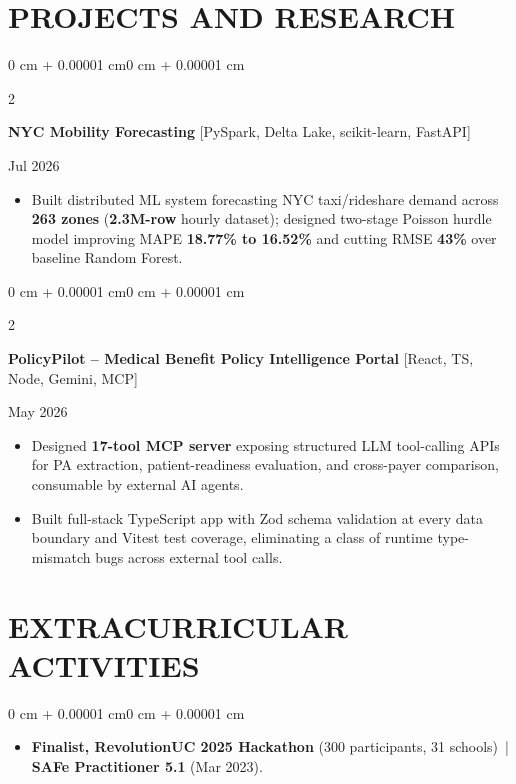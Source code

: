 \documentclass[10pt, letterpaper]{article}
\newenvironment{highlights}{
    \begin{itemize}[
        topsep=0.10 cm,
        parsep=0.06 cm,
        partopsep=0pt,
        itemsep=0.06 cm,
        leftmargin=12pt
    ]
}{
    \end{itemize}
}
\newenvironment{onecolentry}{
    \begin{adjustwidth}{0 cm + 0.00001 cm}{0 cm + 0.00001 cm}
}{
    \end{adjustwidth}
}
\newenvironment{twocolentry}[2][]{
    \onecolentry
    \def\secondColumn{#2}
    \setcolumnwidth{\fill, 4.5 cm}
    \begin{paracol}{2}
}{
    \switchcolumn \raggedleft \secondColumn
    \end{paracol}
    \endonecolentry
}
\begin{document}
\section{PROJECTS AND RESEARCH}
\begin{twocolentry}{Jul 2026}
\textbf{NYC Mobility Forecasting} [PySpark, Delta Lake, scikit-learn, FastAPI]
\end{twocolentry}
\begin{highlights}
  \item Built distributed ML system forecasting NYC taxi/rideshare demand across \textbf{263 zones} (\textbf{2.3M-row} hourly dataset); designed two-stage Poisson hurdle model improving MAPE \textbf{18.77\% to 16.52\%} and cutting RMSE \textbf{43\%} over baseline Random Forest.
\end{highlights}

\vspace{0.12 cm}

\begin{twocolentry}{May 2026}
\textbf{PolicyPilot -- Medical Benefit Policy Intelligence Portal} [React, TS, Node, Gemini, MCP]
\end{twocolentry}
\begin{highlights}
  \item Designed \textbf{17-tool MCP server} exposing structured LLM tool-calling APIs for PA extraction, patient-readiness evaluation, and cross-payer comparison, consumable by external AI agents.
  \item Built full-stack TypeScript app with Zod schema validation at every data boundary and Vitest test coverage, eliminating a class of runtime type-mismatch bugs across external tool calls.
\end{highlights}

\section{EXTRACURRICULAR ACTIVITIES}
\begin{onecolentry}
\begin{highlights}
  \item \textbf{Finalist, RevolutionUC 2025 Hackathon} (300 participants, 31 schools) \,|\, \textbf{SAFe Practitioner 5.1} (Mar 2023).
\end{highlights}
\end{onecolentry}
\end{document}
